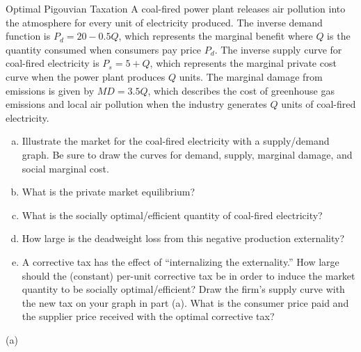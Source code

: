 \documentclass[10pt]{extarticle}
\title{}
\author{Avinash Iyer}
\date{}
\begin{document}
  \begin{problem}{Optimal Pigouvian Taxation}
    A coal-fired power plant releases air pollution into the atmosphere for every unit of electricity produced. The inverse demand function is $P_d = 20 - 0.5Q$, which represents the marginal benefit where $Q$ is the quantity consumed when consumers pay price $P_d$. The inverse supply curve for coal-fired electricity is $P_s = 5 + Q$, which represents the marginal private cost curve when the power plant produces $Q$ units. The marginal damage from emissions is given by $MD = 3.5Q$, which describes the cost of greenhouse gas emissions and local air pollution when the industry generates $Q$ units of coal-fired electricity.
    \begin{enumerate}[(a)]
      \item Illustrate the market for the coal-fired electricity with a supply/demand graph. Be sure to draw the curves for demand, supply, marginal damage, and social marginal cost.
      \item What is the private market equilibrium?
      \item What is the socially optimal/efficient quantity of coal-fired electricity?
      \item How large is the deadweight loss from this negative production externality?
      \item A corrective tax has the effect of ``internalizing the externality.'' How large should the (constant) per-unit corrective tax be in order to induce the market quantity to be socially optimal/efficient? Draw the firm's supply curve with the new tax on your graph in part (a). What is the consumer price paid and the supplier price received with the optimal corrective tax?
    \end{enumerate}
    \tcblower
    \begin{problem}{(a)}
      \begin{center}
\end{center}
\end{problem}
\end{problem}
\end{document}

